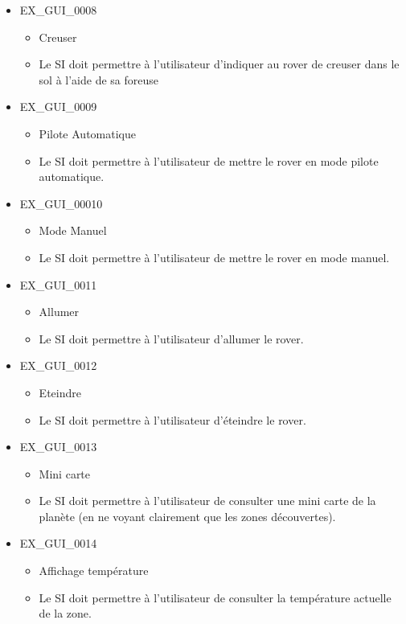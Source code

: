 \documentclass[12pt,a4paper]{scrartcl}
\begin{document}
\begin{itemize}
\item EX\_GUI\_0008
\begin{itemize}
\item Creuser
\item Le SI doit permettre à l'utilisateur d'indiquer au rover de creuser dans
		le sol à l'aide de sa foreuse
\end{itemize}

\item EX\_GUI\_0009
\begin{itemize}
\item Pilote Automatique
\item Le SI doit permettre à l'utilisateur de mettre le rover en mode pilote
		automatique.
\end{itemize}

\item EX\_GUI\_00010
\begin{itemize}
\item Mode Manuel
\item Le SI doit permettre à l'utilisateur de mettre le rover en mode manuel.
\end{itemize}

\item EX\_GUI\_0011
\begin{itemize}
\item Allumer
\item Le SI doit permettre à l'utilisateur d'allumer le rover.
\end{itemize}

\item EX\_GUI\_0012
\begin{itemize}
\item Eteindre
\item Le SI doit permettre à l'utilisateur d'éteindre le rover.
\end{itemize}

\item EX\_GUI\_0013
\begin{itemize}
\item Mini carte
\item Le SI doit permettre à l'utilisateur de consulter une mini carte de la planète (en ne voyant clairement que les zones découvertes).
\end{itemize}

\item EX\_GUI\_0014
\begin{itemize}
\item Affichage température
\item Le SI doit permettre à l'utilisateur de consulter la température actuelle
		de la zone.
\end{itemize}

\end{itemize}
\end{document}
